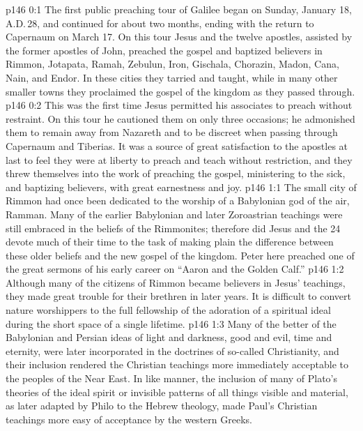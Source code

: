 \author{Midwayer Commission}
\vs p146 0:1 The first public preaching tour of Galilee began on Sunday, January 18, A.D.\,28, and continued for about two months, ending with the return to Capernaum on March 17. On this tour Jesus and the twelve apostles, assisted by the former apostles of John, preached the gospel and baptized believers in Rimmon, Jotapata, Ramah, Zebulun, Iron, Gischala, Chorazin, Madon, Cana, Nain, and Endor. In these cities they tarried and taught, while in many other smaller towns they proclaimed the gospel of the kingdom as they passed through.
\vs p146 0:2 This was the first time Jesus permitted his associates to preach without restraint. On this tour he cautioned them on only three occasions; he admonished them to remain away from Nazareth and to be discreet when passing through Capernaum and Tiberias. It was a source of great satisfaction to the apostles at last to feel they were at liberty to preach and teach without restriction, and they threw themselves into the work of preaching the gospel, ministering to the sick, and baptizing believers, with great earnestness and joy.
\vs p146 1:1 The small city of Rimmon had once been dedicated to the worship of a Babylonian god of the air, Ramman. Many of the earlier Babylonian and later Zoroastrian teachings were still embraced in the beliefs of the Rimmonites; therefore did Jesus and the 24 devote much of their time to the task of making plain the difference between these older beliefs and the new gospel of the kingdom. Peter here preached one of the great sermons of his early career on “Aaron and the Golden Calf.”
\vs p146 1:2 Although many of the citizens of Rimmon became believers in Jesus’ teachings, they made great trouble for their brethren in later years. It is difficult to convert nature worshippers to the full fellowship of the adoration of a spiritual ideal during the short space of a single lifetime.
\vs p146 1:3 \pc Many of the better of the Babylonian and Persian ideas of light and darkness, good and evil, time and eternity, were later incorporated in the doctrines of so\hyp{}called Christianity, and their inclusion rendered the Christian teachings more immediately acceptable to the peoples of the Near East. In like manner, the inclusion of many of Plato’s theories of the ideal spirit or invisible patterns of all things visible and material, as later adapted by Philo to the Hebrew theology, made Paul’s Christian teachings more easy of acceptance by the western Greeks.
